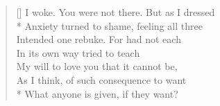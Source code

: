 \documentclass[MAIN]{subfiles}
\begin{document}
\settowidth{\versewidth}{I woke. You were not there. But as I dressed}
\begin{verse}[\versewidth]
I woke. You were not there. But as I dressed\\*
Anxiety turned to shame, feeling all three\\
Intended one rebuke. For had not each\\
In its own way tried to teach\\
My will to love you that it cannot be,\\
As I think, of such consequence to want\\*
What anyone is given, if they want?
\end{verse}
\end{document}
